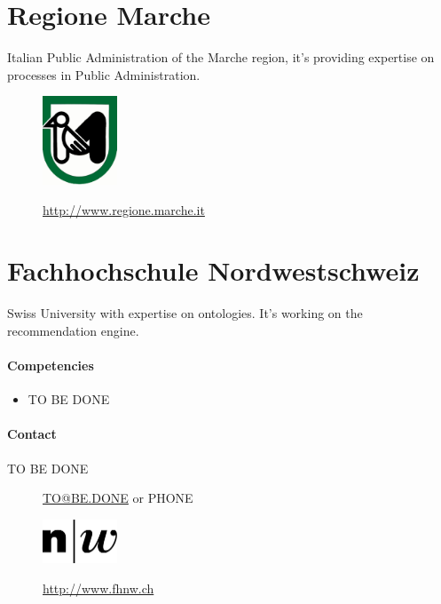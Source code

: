 \documentclass{learnpad}
\begin{document}
\section{Regione Marche}
Italian Public Administration of the Marche region, it's providing expertise on
processes in Public Administration.

\begin{figure}[!htp]
	\centering
	\includegraphics[width=6em,keepaspectratio]{figures/marche.jpg}\par
	\url{http://www.regione.marche.it}
\end{figure}

\section{Fachhochschule Nordwestschweiz}
Swiss University with expertise on ontologies.  It's working on the
recommendation engine.

\paragraph{Competencies}
\begin{itemize}
	\item TO BE DONE
\end{itemize}

\paragraph{Contact}
\begin{description}
	\item[TO BE DONE] \href{mailto:TO@BE.DONE}{TO@BE.DONE} or PHONE
\end{description}

\begin{figure}[!htp]
	\centering
	\includegraphics[width=6em,keepaspectratio]{figures/fhnw.jpg}\par
	\url{http://www.fhnw.ch}
\end{figure}
\end{document}
